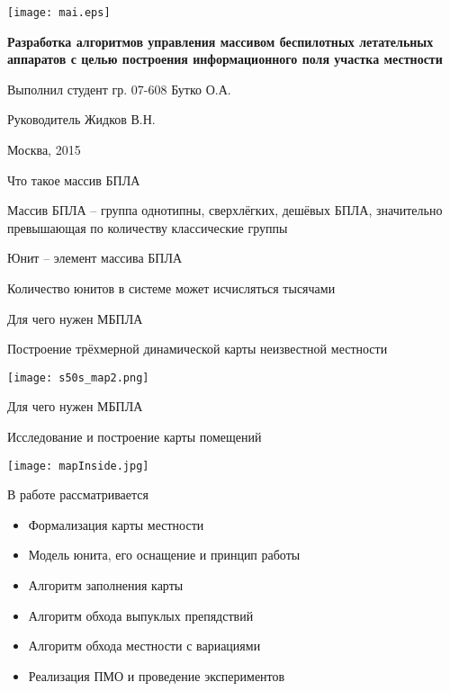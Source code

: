 



\begin{cslide}
    \texttt{[image: mai.eps]}

    \large\textbf{ Разработка алгоритмов управления
    массивом беспилотных летательных аппаратов
    с целью построения информационного поля
    участка местности}

    \vfill

    \begin{flushright}
    \small Выполнил студент гр. 07-608 Бутко О.А.

    \small Руководитель Жидков В.Н.
    \end{flushright}

    \vfill

    \small Москва, 2015
\end{cslide}

\begin{tslide}{Что такое массив БПЛА}

    Массив БПЛА -- группа однотипны, сверхлёгких, дешёвых БПЛА,
    значительно превышающая по количеству классические группы

    Юнит -- элемент массива БПЛА

    Количество юнитов в системе может исчисляться тысячами
\end{tslide}

\begin{tslide}{Для чего нужен МБПЛА}

    Построение трёхмерной динамической \newline
        карты неизвестной местности

    \begin{center}
    \texttt{[image: s50s\_map2.png]}
    \end{center}
\end{tslide}

\begin{tslide}{Для чего нужен МБПЛА}

    Исследование и построение карты помещений

    \begin{center}
    \texttt{[image: mapInside.jpg]}
    \end{center}

\end{tslide}

\begin{tslide}{В работе рассматривается}

\begin{itemize}
\item Формализация карты местности
\item Модель юнита, его оснащение и принцип работы
\item Алгоритм заполнения карты
\item Алгоритм обхода выпуклых препядствий
\item Алгоритм обхода местности с вариациями
\item Реализация ПМО и проведение экспериментов
\end{itemize}

\end{tslide}

